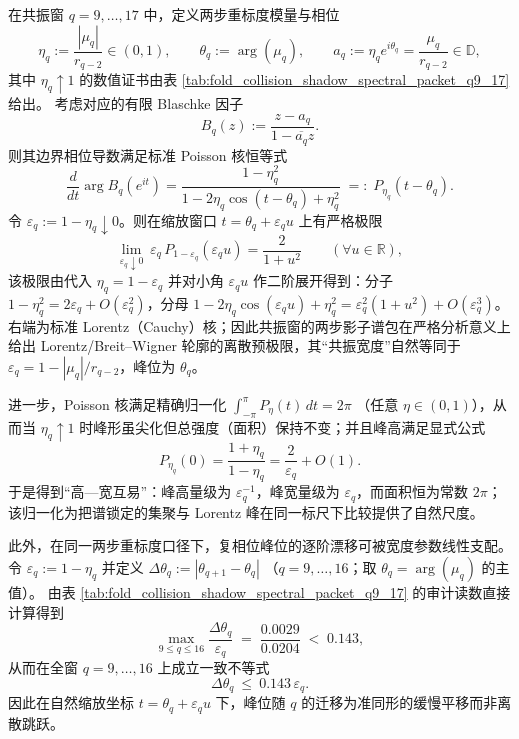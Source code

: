 \begin{remark}[两步重标度点的 Poisson 峰 \texorpdfstring{$\Rightarrow$}{=>} Lorentz 极限：共振窗影子谱包的 Breit--Wigner 离散预极限]\label{rem:pom-resonance-poisson-lorentz-prelimit}
在共振窗 \(q=9,\dots,17\) 中，定义两步重标度模量与相位
\[
\eta_q:=\frac{|\mu_q|}{r_{q-2}}\in(0,1),\qquad \theta_q:=\arg(\mu_q),
\qquad a_q:=\eta_q e^{i\theta_q}=\frac{\mu_q}{r_{q-2}}\in\mathbb{D},
\]
其中 \(\eta_q\uparrow 1\) 的数值证书由表 \ref{tab:fold_collision_shadow_spectral_packet_q9_17} 给出。
考虑对应的有限 Blaschke 因子
\[
B_q(z):=\frac{z-a_q}{1-\overline{a_q}z}.
\]
则其边界相位导数满足标准 Poisson 核恒等式
\[
\frac{d}{dt}\arg B_q(e^{it})
=\frac{1-\eta_q^{2}}{1-2\eta_q\cos(t-\theta_q)+\eta_q^{2}}
 \;=:\; P_{\eta_q}(t-\theta_q).
\]
令 \(\varepsilon_q:=1-\eta_q\downarrow 0\)。则在缩放窗口 \(t=\theta_q+\varepsilon_q u\) 上有严格极限
\[
\lim_{\varepsilon_q\downarrow 0}\ \varepsilon_q\,P_{1-\varepsilon_q}(\varepsilon_q u)=\frac{2}{1+u^{2}}
\qquad(\forall u\in\mathbb{R}),
\]
该极限由代入 \(\eta_q=1-\varepsilon_q\) 并对小角 \(\varepsilon_q u\) 作二阶展开得到：分子 \(1-\eta_q^2=2\varepsilon_q+O(\varepsilon_q^2)\)，分母 \(1-2\eta_q\cos(\varepsilon_q u)+\eta_q^2=\varepsilon_q^2(1+u^2)+O(\varepsilon_q^3)\)。
右端为标准 Lorentz（Cauchy）核；因此共振窗的两步影子谱包在严格分析意义上给出 Lorentz/Breit--Wigner 轮廓的离散预极限，其“共振宽度”自然等同于 \(\varepsilon_q=1-|\mu_q|/r_{q-2}\)，峰位为 \(\theta_q\)。
\par
进一步，Poisson 核满足精确归一化
\(
\int_{-\pi}^{\pi}P_{\eta}(t)\,dt=2\pi
\)
（任意 \(\eta\in(0,1)\)），从而当 \(\eta_q\uparrow 1\) 时峰形虽尖化但总强度（面积）保持不变；并且峰高满足显式公式
\[
P_{\eta_q}(0)=\frac{1+\eta_q}{1-\eta_q}=\frac{2}{\varepsilon_q}+O(1).
\]
于是得到“高—宽互易”：峰高量级为 \(\varepsilon_q^{-1}\)，峰宽量级为 \(\varepsilon_q\)，而面积恒为常数 \(2\pi\)；该归一化为把谱锁定的集聚与 Lorentz 峰在同一标尺下比较提供了自然尺度。
\par
此外，在同一两步重标度口径下，复相位峰位的逐阶漂移可被宽度参数线性支配。
令
\(
\varepsilon_q:=1-\eta_q
\)
并定义
\(
\Delta\theta_q:=|\theta_{q+1}-\theta_q|
\)
（\(q=9,\dots,16\)；取 \(\theta_q=\arg(\mu_q)\) 的主值）。
由表 \ref{tab:fold_collision_shadow_spectral_packet_q9_17} 的审计读数直接计算得到
\[
\max_{9\le q\le 16}\frac{\Delta\theta_q}{\varepsilon_q}
\;=\;\frac{0.0029}{0.0204}\;<\;0.143,
\]
从而在全窗 \(q=9,\dots,16\) 上成立一致不等式
\[
\Delta\theta_q\ \le\ 0.143\,\varepsilon_q.
\]
因此在自然缩放坐标 \(t=\theta_q+\varepsilon_q u\) 下，峰位随 \(q\) 的迁移为准同形的缓慢平移而非离散跳跃。
\end{remark}

